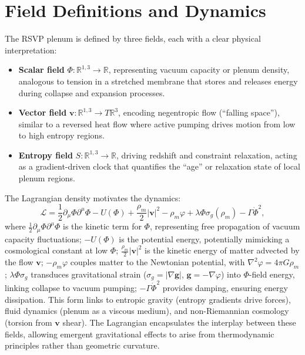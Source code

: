 \documentclass[11pt]{article}
\theoremstyle{plain}
\theoremstyle{definition}
\begin{document}
\section{Field Definitions and Dynamics}
The RSVP plenum is defined by three fields, each with a clear physical interpretation:
\begin{itemize}
    \item \textbf{Scalar field} $\Phi: \mathbb{R}^{1,3} \to \mathbb{R}$, representing vacuum capacity or plenum density, analogous to tension in a stretched membrane that stores and releases energy during collapse and expansion processes.
    \item \textbf{Vector field} $\bm{v}: \mathbb{R}^{1,3} \to T\mathbb{R}^3$, encoding negentropic flow (``falling space''), similar to a reversed heat flow where active pumping drives motion from low to high entropy regions.
    \item \textbf{Entropy field} $S: \mathbb{R}^{1,3} \to \mathbb{R}$, driving redshift and constraint relaxation, acting as a gradient-driven clock that quantifies the ``age'' or relaxation state of local plenum regions.
\end{itemize}
The Lagrangian density motivates the dynamics:
\begin{equation}
\mathcal{L} = \frac{1}{2} \partial_\mu \Phi \partial^\mu \Phi - U(\Phi) + \frac{\rho_m}{2} |\bm{v}|^2 - \rho_m \varphi + \lambda \Phi \sigma_g(\rho_m) - \Gamma \dot{\Phi}^2,
\label{eq:L}
\end{equation}
where $\frac{1}{2} \partial_\mu \Phi \partial^\mu \Phi$ is the kinetic term for $\Phi$, representing free propagation of vacuum capacity fluctuations; $-U(\Phi)$ is the potential energy, potentially mimicking a cosmological constant at low $\Phi$; $\frac{\rho_m}{2} |\bm{v}|^2$ is the kinetic energy of matter advected by the flow $\bm{v}$; $-\rho_m \varphi$ couples matter to the Newtonian potential, with $\nabla^2 \varphi = 4\pi G \rho_m$; $\lambda \Phi \sigma_g$ transduces gravitational strain ($\sigma_g = |\nabla \bm{g}|$, $\bm{g} = -\nabla \varphi$) into $\Phi$-field energy, linking collapse to vacuum pumping; $-\Gamma \dot{\Phi}^2$ provides damping, ensuring energy dissipation.
This form links to entropic gravity (entropy gradients drive forces), fluid dynamics (plenum as a viscous medium), and non-Riemannian cosmology (torsion from $\bm{v}$ shear). The Lagrangian encapsulates the interplay between these fields, allowing emergent gravitational effects to arise from thermodynamic principles rather than geometric curvature.
\end{document}
